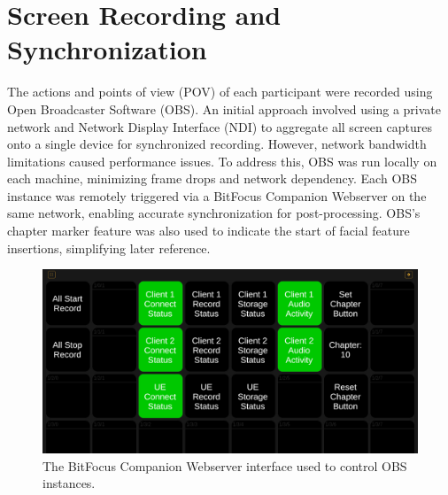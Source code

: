 \section{Screen Recording and Synchronization}
The actions and points of view (POV) of each participant were recorded using Open Broadcaster Software (OBS). An initial approach involved using a private network and Network Display Interface (NDI) to aggregate all screen captures onto a single device for synchronized recording. However, network bandwidth limitations caused performance issues. To address this, OBS was run locally on each machine, minimizing frame drops and network dependency. Each OBS instance was remotely triggered via a BitFocus Companion Webserver on the same network, enabling accurate synchronization for post-processing. OBS's chapter marker feature was also used to indicate the start of facial feature insertions, simplifying later reference.

\begin{figure}[H]
    \centering
    \includegraphics[width=\textwidth]{images/CompanionControl.png}
    \caption{The BitFocus Companion Webserver interface used to control OBS instances.}
    \label{fig:obs_recording}
\end{figure}

